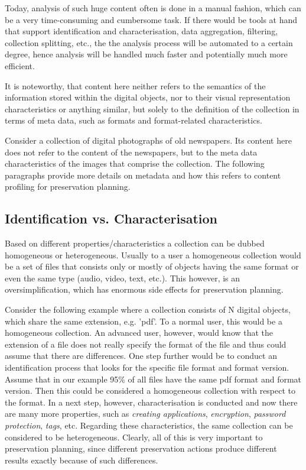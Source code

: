 Today, analysis of such huge content often is done in a manual fashion, which can be a very time-consuming and cumbersome task. If there would be tools at hand that support identification and characterisation, data aggregation, filtering, collection splitting, etc., the the analysis process will be automated to a certain degree, hence analysis will be handled much faster and potentially much more efficient. 

It is noteworthy, that content here neither refers to the semantics of the information stored within the digital objects, nor to their visual representation characteristics or anything similar, but solely to the definition of the collection in terms of meta data, such as formats and format-related characteristics.

Consider a collection of digital photographs of old newspapers. Its content here does not refer to the content of the newspapers, but to the meta data characteristics of the images that comprise the collection. The following paragraphs provide more details on metadata and how this refers to content profiling for preservation planning.

\subsection{Identification vs. Characterisation}
Based on different properties/characteristics a collection can be dubbed homogeneous or heterogeneous. Usually to a user a homogeneous collection would be a set of files that consists only or mostly of objects having the same format or even the same type (audio, video, text, etc.). This however, is an oversimplification, which has enormous side effects for preservation planning.

Consider the following example where a collection consists of N digital objects, which share the same extension, e.g. 'pdf'. To a normal user, this would be a homogeneous collection. An advanced user, however, would know that the extension of a file does not really specify the format of the file and thus could assume that there are differences.
One step further would be to conduct an identification process that looks for the specific file format and format version. Assume that in our example 95\% of all files have the same pdf format and format version.  Then this could be considered a homogeneous collection with respect to the format. 
In a next step, however, characterisation is conducted and now there are many more properties, such as \textit{creating applications}, \textit{encryption}, \textit{password protection}, \textit{tags}, etc.
Regarding these characteristics, the same collection can be considered to be heterogeneous.
Clearly, all of this is very important to preservation planning, since different preservation actions produce different results exactly because of such differences.

